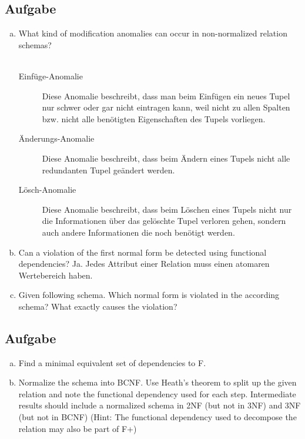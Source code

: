 \documentclass[11pt,a4paper,DIV=9]{scrartcl}
\newcounter{temp}
\newcommand{\aufgabe}[1]{
  \setcounter{temp}{\value{subsection}}
  \setcounter{subsection}{#1}
  \addtocounter{subsection}{-1}
  \subsection{Aufgabe}
  \setcounter{subsection}{\value{temp}}
}
\begin{document}
\aufgabe{3}
  \begin{enumerate}[a.]
    \item What kind of modification anomalies can occur in non-normalized relation schemas? \\\\
      \begin{description}
        \item[Einf\"uge-Anomalie]  Diese Anomalie beschreibt, dass man beim Einf\"ugen ein neues Tupel nur schwer oder gar nicht eintragen kann, weil nicht zu allen Spalten bzw. nicht alle ben\"otigten Eigenschaften des Tupels vorliegen.
        \item[\"Anderungs-Anomalie] Diese Anomalie beschreibt, dass beim \"Andern eines Tupels nicht alle redundanten Tupel ge\"andert werden. 
        \item[L\"osch-Anomalie] Diese Anomalie beschreibt, dass beim L\"oschen eines Tupels nicht nur die Informationen \"uber das gel\"oschte Tupel verloren gehen, sondern auch andere Informationen die noch ben\"otigt werden.
      \end{description}
    \item Can a violation of the first normal form be detected using functional dependencies?
      Ja. Jedes Attribut einer Relation muss einen atomaren Wertebereich haben.
    \item Given following schema. Which normal form is violated in the according schema? What exactly causes the
    violation?
  \end{enumerate}

\aufgabe{4}
  \begin{enumerate}[a.]
    \item Find a minimal equivalent set of dependencies to F.
    \item Normalize the schema into BCNF. Use Heath's theorem to split up the given relation and note the functional dependency used for each step. Intermediate results should include a normalized schema in 2NF (but not in 3NF) and 3NF (but not in BCNF) (Hint: The functional dependency used to decompose the relation may also be part of F+)
  \end{enumerate}
\end{document}
